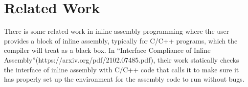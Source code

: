 \documentclass{article}
\begin{document}
\section{Related Work}
There is some related work in inline assembly programming where the user provides a block of inline assembly, typically for C/C++ programs, which the compiler will treat as a black box. In ``Interface Compliance of Inline Assembly''(https://arxiv.org/pdf/2102.07485.pdf), their work statically checks the interface of inline assembly with C/C++ code that calls it to make sure it has properly set up the environment for the assembly code to run without bugs.
\end{document}
